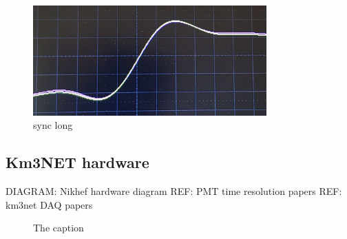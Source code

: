 \begin{figure} %
    \includegraphics[width=0.8\textwidth]{diagrams/6-daq/sync.jpg}
    \caption[sync short]
    {sync long}
    \label{fig:sync}
\end{figure}

\subsection{Km3NET hardware} %
\label{sec:daq_hard_km3net} %

DIAGRAM: Nikhef hardware diagram
REF: PMT time resolution papers
REF: km3net DAQ papers

\begin{figure} %
    \centering
    \quad
    \caption[The caption]
    {The caption}
\end{figure}

